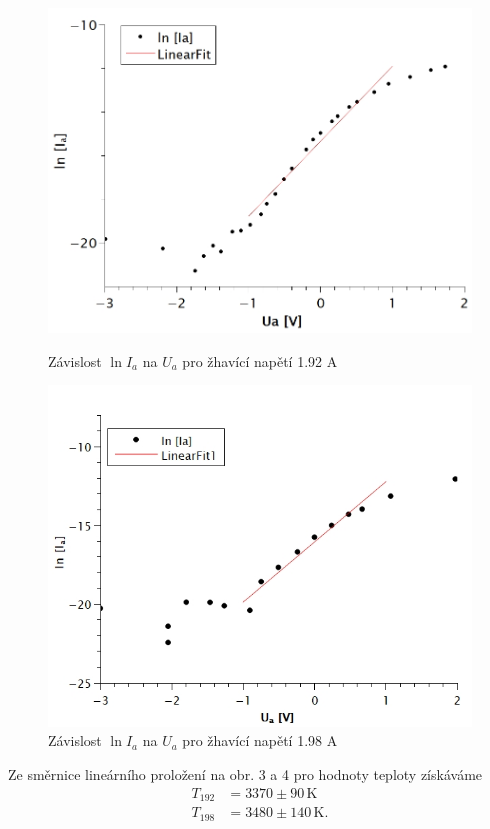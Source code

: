 \documentclass[czech,11pt,a4paper]{article}
\begin{document}
\begin{multicols}{2}
		\begin{figure}[H]
		\centering
		\includegraphics[width=0.7\linewidth]{192IaUa}
		\caption{Závislost $\ln I_a$ na $U_a$ pro žhavící napětí 1.92 A}
		\label{fig:192iaua - }
		\includegraphics[width=0.7\linewidth]{198IaUa}
		\caption{Závislost $\ln I_a$ na $U_a$ pro žhavící napětí 1.98 A} 
		\end{figure}
		Ze směrnice lineárního proložení na obr. 3  a 4 pro hodnoty teploty získáváme		
		\begin{align*}
			T_{192} &= 3370 \pm 90 \,\text{K} \\
			T_{198}& = 3480 \pm 140 \,\text{K}.
		\end{align*}
		\quad \\
		\quad \\\quad \\
		\quad \\\quad \\
		

\end{multicols}
\end{document}
